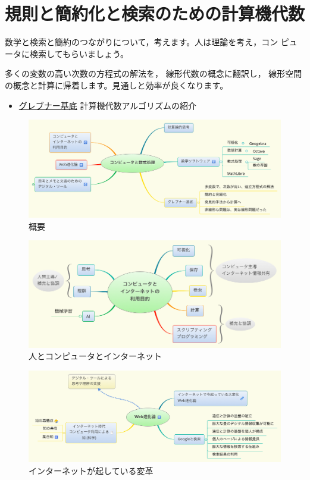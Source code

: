 \documentclass[dvipdfmx,11pat]{jarticle}
\begin{document}
\section*{規則と簡約化と検索のための計算機代数}
\label{sec:orgeac263d}

数学と検索と簡約のつながりについて，考えます。人は理論を考え，コン
ピュータに検索してもらいましょう。

多くの変数の高い次数の方程式の解法を，
線形代数の概念に翻訳し，
線形空間の概念と計算に帰着します。見通しと効率が良くなります。

\begin{itemize}
\item \href{./org/groebner.org}{グレブナー基底} 計算機代数アルゴリズムの紹介
\end{itemize}

\begin{figure}[htbp]
\centering
\includegraphics[width=18cm]{./map-images/01-computer_and_cal.png}
\caption{概要}
\end{figure}

\begin{figure}[htbp]
\centering
\includegraphics[width=18cm]{./map-images/03-how_to_use_computer_and_internet.png}
\caption{人とコンピュータとインターネット}
\end{figure}


\vspace{3cm}

\begin{figure}[htbp]
\centering
\includegraphics[width=18cm]{./map-images/04-Web_revolution.png}
\caption{インターネットが起している変革}
\end{figure}
\end{document}
